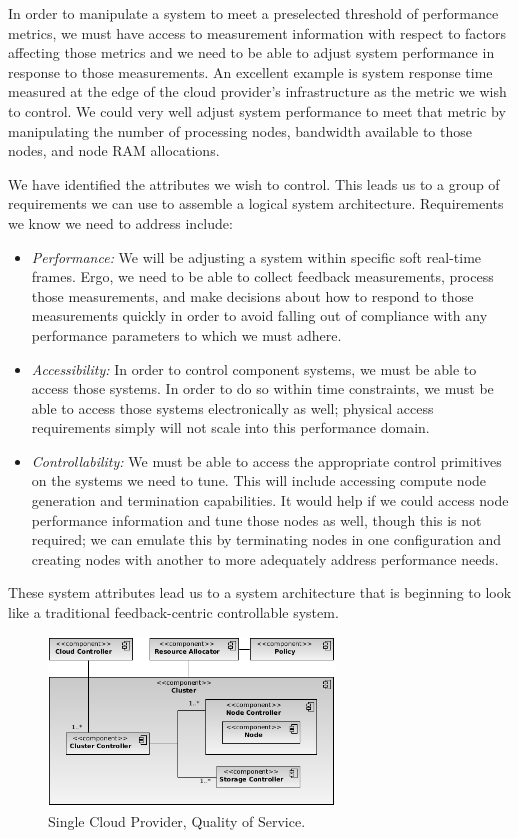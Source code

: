 \documentclass[times, 10pt,twocolumn]{article}
\begin{document}
In order to manipulate a system to meet a preselected threshold of performance metrics, we must have access to measurement information with respect to factors affecting those metrics and we need to be able to adjust system performance in response to those measurements.  An excellent example is system response time measured at the edge of the cloud provider's infrastructure as the metric we wish to control.  We could very well adjust system performance to meet that metric by manipulating the number of processing nodes, bandwidth available to those nodes, and node RAM allocations.

We have identified the attributes we wish to control.  This leads us to a group of requirements we can use to assemble a logical system architecture.  Requirements we know we need to address include:

\begin{itemize}
\item \textit{Performance:} We will be adjusting a system within specific soft real-time frames.  Ergo, we need to be able to collect feedback measurements, process those measurements, and make decisions about how to respond to those measurements quickly in order to avoid falling out of compliance with any performance parameters to which we must adhere.
\item \textit{Accessibility:} In order to control component systems, we must be able to access those systems.  In order to do so within time constraints, we must be able to access those systems electronically as well; physical access requirements simply will not scale into this performance domain.
\item \textit{Controllability:} We must be able to access the appropriate control primitives on the systems we need to tune.  This will include accessing compute node generation and termination capabilities.  It would help if we could access node performance information and tune those nodes as well, though this is not required; we can emulate this by terminating nodes in one configuration and creating nodes with another to more adequately address performance needs.
\end{itemize}

These system attributes lead us to a system architecture that is beginning to look like a traditional feedback-centric controllable system.

\begin{figure}[!t]
\centering
\includegraphics[width=3in]{Single-QoS}
\caption{Single Cloud Provider, Quality of Service.}
\label{fig:single-qos}
\end{figure}
\end{document}
